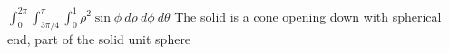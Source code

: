 {$\int_{0}^{2\pi} \int_{3\pi/4}^{\pi} \int_{0}^{1} \rho^2 \sin\phi \: d\rho \: d\phi \: d\theta$
}
{The solid is a cone opening down with spherical end, part of the solid unit sphere}